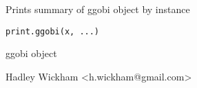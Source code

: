 \begin{Description}\relax
Prints summary of ggobi object by instance
\end{Description}
\begin{Usage}
\begin{verbatim}print.ggobi(x, ...)\end{verbatim}
\end{Usage}
\begin{Arguments}
\begin{ldescription}
\item[\code{x}] ggobi object
\item[\code{...}] 
\end{ldescription}
\end{Arguments}
\begin{Details}\relax
\end{Details}
\begin{Author}\relax
Hadley Wickham <h.wickham@gmail.com>
\end{Author}
\begin{SeeAlso}\relax
{}
\end{SeeAlso}
\begin{Examples}
\begin{ExampleCode}\end{ExampleCode}
\end{Examples}

